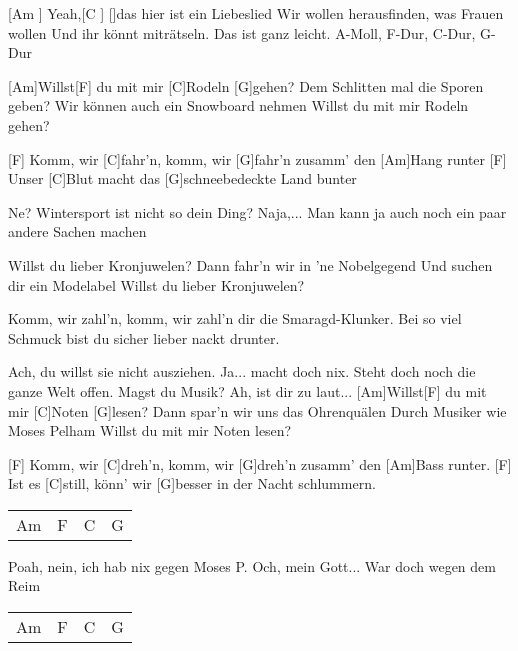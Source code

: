 


\vspace{-0.6em}

\begin{guitar}
	[Am ] Yeah,[C ] []das hier ist ein Liebeslied
	Wir wollen herausfinden, was Frauen wollen
	Und ihr könnt miträtseln. Das ist ganz leicht.
	A-Moll, F-Dur, C-Dur, G-Dur
	
	[Am]Willst[F] du mit mir [C]Rodeln [G]gehen?
	Dem Schlitten mal die Sporen geben?
	Wir können auch ein Snowboard nehmen
	Willst du mit mir Rodeln gehen?
	
	[F] Komm, wir [C]fahr'n, komm, wir [G]fahr'n zusamm' den [Am]Hang runter 
	[F] Unser [C]Blut macht das [G]schneebedeckte Land bunter
	
	Ne? Wintersport ist nicht so dein Ding? Naja,... 
	Man kann ja auch noch ein paar andere Sachen machen
	
	Willst du lieber Kronjuwelen?
	Dann fahr'n wir in 'ne Nobelgegend
	Und suchen dir ein Modelabel
	Willst du lieber Kronjuwelen?
	
	Komm, wir zahl'n, komm, wir zahl'n dir die Smaragd-Klunker. 
	Bei so viel Schmuck bist du sicher lieber nackt drunter.
	
	Ach, du willst sie nicht ausziehen. Ja... macht doch nix. Steht doch noch 
	die ganze Welt offen. Magst du Musik? Ah, ist dir zu laut...
	\pagebreak
	[Am]Willst[F] du mit mir [C]Noten [G]lesen?
	Dann spar'n wir uns das Ohrenquälen
	Durch Musiker wie Moses Pelham
	Willst du mit mir Noten lesen?
	
	[F] Komm, wir [C]dreh'n, komm, wir [G]dreh'n zusamm' den [Am]Bass runter. 
	[F] Ist es [C]still, könn' wir [G]besser in der Nacht schlummern.
	
	{\footnotesize\begin{tabular}{|l|l|l|l|}
			Am & F & C & G
	\end{tabular}}
	Poah, nein, ich hab nix gegen Moses P. 
	Och, mein Gott... War doch wegen dem Reim
	{\footnotesize\begin{tabular}{|l|l|l|l|}
			Am & F & C & G
	\end{tabular}}
	

\end{guitar}
